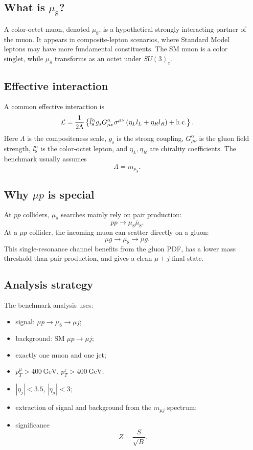 \documentclass[11pt,a4paper]{article}
\newcommand{\gev}{\ensuremath{~\mathrm{GeV}}}
\begin{document}
\subsection{What is \(\mu_8\)?}

A color-octet muon, denoted \(\mu_8\), is a hypothetical strongly interacting partner of
the muon.  It appears in composite-lepton scenarios, where Standard Model leptons may
have more fundamental constituents.  The SM muon is a color singlet, while \(\mu_8\)
transforms as an octet under \(SU(3)_c\).

\subsection{Effective interaction}

A common effective interaction is
\begin{equation}
  \mathcal{L}
  =
  \frac{1}{2\Lambda}
  \left\{
  \bar l_8^\alpha
  g_sG_{\mu\nu}^\alpha
  \sigma^{\mu\nu}
  \left(\eta_Ll_L+\eta_Rl_R\right)
  +{\rm h.c.}
  \right\}.
  \label{eq:leptogluon}
\end{equation}
Here \(\Lambda\) is the compositeness scale, \(g_s\) is the strong coupling,
\(G_{\mu\nu}^\alpha\) is the gluon field strength, \(l_8^\alpha\) is the color-octet lepton,
and \(\eta_L,\eta_R\) are chirality coefficients.  The benchmark usually assumes
\[
  \Lambda=m_{\mu_8}.
\]

\subsection{Why \(\mu p\) is special}

At \(pp\) colliders, \(\mu_8\) searches mainly rely on pair production:
\[
  pp\to\mu_8\bar\mu_8.
\]
At a \(\mu p\) collider, the incoming muon can scatter directly on a gluon:
\[
  \mu g\to\mu_8\to\mu g.
\]
This single-resonance channel benefits from the gluon PDF, has a lower mass threshold than
pair production, and gives a clean \(\mu+j\) final state.

\subsection{Analysis strategy}

The benchmark analysis uses:
\begin{itemize}[leftmargin=*]
  \item signal: \(\mu p\to\mu_8\to\mu j\);
  \item background: SM \(\mu p\to\mu j\);
  \item exactly one muon and one jet;
  \item \(p_T^\mu>400\gev\), \(p_T^j>400\gev\);
  \item \(|\eta_j|<3.5\), \(|\eta_\mu|<3\);
  \item extraction of signal and background from the \(m_{\mu j}\) spectrum;
  \item significance
  \[
    Z=\frac{S}{\sqrt{B}}.
  \]
\end{itemize}
\end{document}

